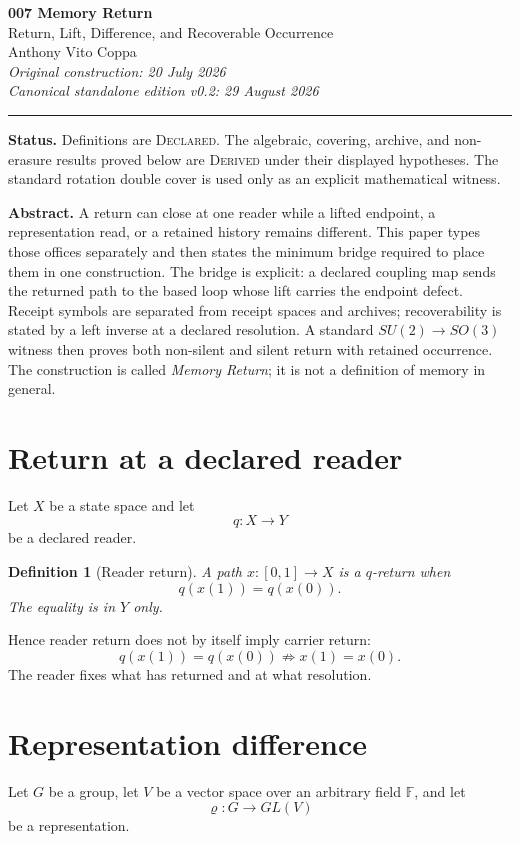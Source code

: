 \documentclass[11pt]{article}
\newtheorem{definition}[theorem]{Definition}
\newcommand{\status}[1]{\textbf{Status.} #1}
\begin{document}
\begin{center}
{\Large\bfseries 007 Memory Return}\\[3pt]
{\large Return, Lift, Difference, and Recoverable Occurrence}\\[10pt]
Anthony Vito Coppa\\[2pt]
\textit{Original construction: 20 July 2026}\\
\textit{Canonical standalone edition v0.2: 29 August 2026}
\end{center}
\vspace{3pt}
\hrule
\vspace{8pt}

\status{Definitions are \textsc{Declared}. The algebraic, covering, archive, and non-erasure results proved below are \textsc{Derived} under their displayed hypotheses. The standard rotation double cover is used only as an explicit mathematical witness.}

\textbf{Abstract.} A return can close at one reader while a lifted endpoint, a representation read, or a retained history remains different. This paper types those offices separately and then states the minimum bridge required to place them in one construction. The bridge is explicit: a declared coupling map sends the returned path to the based loop whose lift carries the endpoint defect. Receipt symbols are separated from receipt spaces and archives; recoverability is stated by a left inverse at a declared resolution. A standard $SU(2)\to SO(3)$ witness then proves both non-silent and silent return with retained occurrence. The construction is called \emph{Memory Return}; it is not a definition of memory in general.

\section{Return at a declared reader}
Let $X$ be a state space and let
\[
q:X\to Y
\]
be a declared reader.

\begin{definition}[Reader return]
A path $x:[0,1]\to X$ is a $q$-return when
\[
q(x(1))=q(x(0)).
\]
The equality is in $Y$ only.
\end{definition}
Hence reader return does not by itself imply carrier return:
\[
q(x(1))=q(x(0))\not\Rightarrow x(1)=x(0).
\]
The reader fixes what has returned and at what resolution.

\section{Representation difference}
Let $G$ be a group, let $V$ be a vector space over an arbitrary field $\mathbb F$, and let
\[
\varrho:G\to GL(V)
\]
be a representation.
\end{document}
